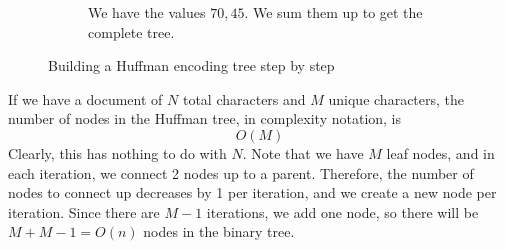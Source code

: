\begin{example}
\begin{figure}[H]
\begin{subfigure}[b]{0.48\textwidth}
        \caption{We have the values $70, 45$. We sum them up to get the complete tree.}
        \label{fig:step4}
      \end{subfigure}
      \caption{Building a Huffman encoding tree step by step}
      \label{fig:huffman-construction}
    \end{figure}
  \end{example}

  \begin{theorem}
    If we have a document of $N$ total characters and $M$ unique characters, the number of nodes in the Huffman tree, in complexity notation, is 
    \begin{equation}
      O(M)
    \end{equation}
    Clearly, this has nothing to do with $N$. Note that we have $M$ leaf nodes, and in each iteration, we connect 2 nodes up to a parent. Therefore, the number of nodes to connect up decreases by 1 per iteration, and we create a new node per iteration. Since there are $M - 1$ iterations, we add one node, so there will be $M + M - 1 = O(n)$ nodes in the binary tree. 
  \end{theorem}

